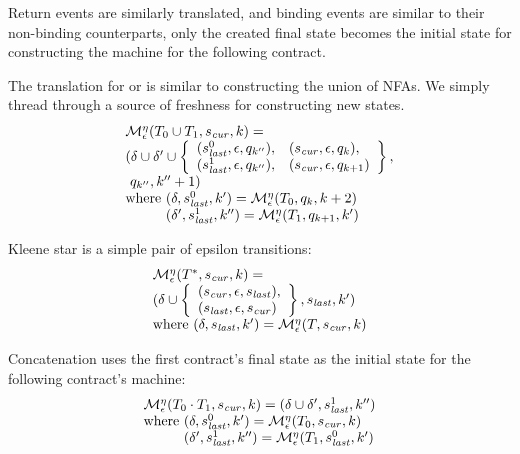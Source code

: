 Return events are similarly translated, and binding events are similar to their non-binding counterparts, only the created final state becomes the initial state for constructing the machine for the following contract.

The translation for or is similar to constructing the union of NFAs.
%
We simply thread through a source of freshness for constructing new states.
%
\begin{align*}
  \begin{array}{l}
  \epshelp^\mtimeline(\stOr{\mtcon_0}{\mtcon_1}, \pmsmqcur, k) = \\
    (\delta\cup \delta' \cup
    \left\{\begin{array}{ll}
        (\pmsmqlast^0, \epsilon, \pmsmq_{k''}),&
        (\pmsmqcur, \epsilon, \pmsmq_k),\\
        (\pmsmqlast^1, \epsilon, \pmsmq_{k''}),&
        (\pmsmqcur, \epsilon, \pmsmq_{k+1})
      \end{array}\right\},
    \\
    \ \pmsmq_{k''}, k''+ 1)
    \\
    \text{where } (\delta, \pmsmqlast^0, k') = \epshelp^\mtimeline(\mtcon_0, \pmsmq_k, k+2) \\
    \phantom{\text{where }} (\delta', \pmsmqlast^1, k'') = \epshelp^\mtimeline(\mtcon_1, \pmsmq_{k+1}, k')
  \end{array}
\end{align*}

Kleene star is a simple pair of epsilon transitions:
\begin{align*}
  \begin{array}{l}
  {\mathcal M}_\epsilon^\eta(T^*, s_\mathit{cur}, k) = \\
  (\delta \cup \left\{
    \begin{array}{l}
      (s_\mathit{cur}, \epsilon, s_\mathit{last}), \\
      (s_\mathit{last}, \epsilon, s_\mathit{cur})
    \end{array}\right\},
  s_\mathit{last}, k')
 \\ \text{where } (\delta, s_\mathit{last}, k') = {\mathcal M}_\epsilon^\eta(T, s_\mathit{cur}, k)
\end{array}
\end{align*}

Concatenation uses the first contract's final state as the initial state for the following contract's machine:
\begin{align*}
  \begin{array}{l}
    \epshelp^\mtimeline(\stseq{\mtcon_0}{\mtcon_1}, \pmsmqcur, k) = 
     (\delta \cup \delta', \pmsmqlast^1, k'')
   \\ \text{where } (\delta, \pmsmqlast^0, k') = \epshelp^\mtimeline(\mtcon_0, \pmsmqcur, k)
   \\\phantom{\text{where }} (\delta', \pmsmqlast^1, k'') = \epshelp^\mtimeline(\mtcon_1, \pmsmqlast^0, k')
  \end{array}
\end{align*}
%

